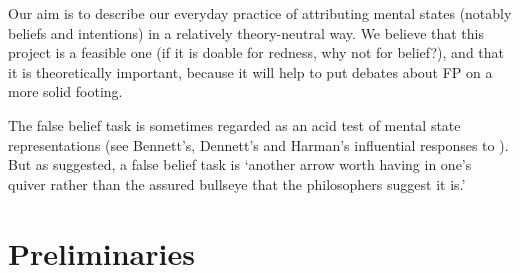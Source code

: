 \documentclass[12pt,a4paper]{article}
\begin{document}
Our aim is to describe our everyday practice of attributing mental states (notably beliefs and intentions) in a relatively theory-neutral way. We believe that this project is a feasible one (if it is doable for redness, why not for belief?), and that it is theoretically important, because it will help to put debates about FP on a more solid footing. 


% 

The false belief task \citep{Wimmer:1983dz} is sometimes regarded as an acid test of mental state representations (see Bennett's, Dennett's and Harman's influential responses to \citealp{premack_does_1978}).
But as \citet[p.~622]{premack_does_1978} suggested, a false belief task is ‘another arrow worth having in one's quiver rather than the assured bullseye that the philosophers suggest it is.’ 

\section{Preliminaries}
\end{document}
